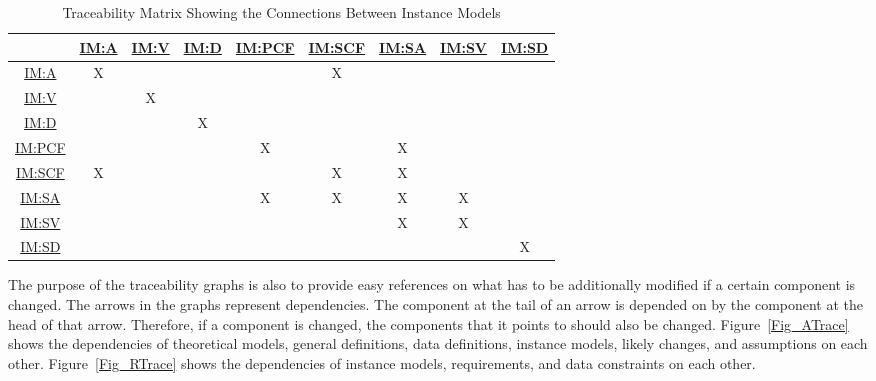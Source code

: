 \documentclass[12pt]{article}
\newcommand{\hpref}[1]{\hyperref[#1]{#1}}
\begin{document}
\begin{table}[h!]
\centering
\begin{tabular}{|c|c|c|c|c|c|c|c|c|}
\hline
	& \hpref{IM:A} & \hpref{IM:V}& \hpref{IM:D} & \hpref{IM:PCF} & \hpref{IM:SCF} & \hpref{IM:SA}& \hpref{IM:SV}& \hpref{IM:SD}\\
\hline
\hpref{IM:A}       &X& & & &X& & &  \\ \hline
\hpref{IM:V}       & &X& & & & & &  \\ \hline
\hpref{IM:D}       & & &X& & & & &  \\ \hline
\hpref{IM:PCF}       & & & &X& &X& &  \\ \hline
\hpref{IM:SCF}       &X& & & &X&X& &  \\ \hline
\hpref{IM:SA}       & & & &X&X&X&X&  \\ \hline
\hpref{IM:SV}       & & & & & &X&X&  \\ \hline
\hpref{IM:SD}       & & & & & & & &X \\ \hline
\end{tabular}
\caption{Traceability Matrix Showing the Connections Between Instance Models}
\label{Table:trace_IM}
\end{table}


The purpose of the traceability graphs is also to provide easy references on
what has to be additionally modified if a certain component is changed.  The
arrows in the graphs represent dependencies. The component at the tail of an
arrow is depended on by the component at the head of that arrow. Therefore, if a
component is changed, the components that it points to should also be
changed. Figure~\ref{Fig_ATrace} shows the dependencies of theoretical models,
general definitions, data definitions, instance models, likely changes, and
assumptions on each other. Figure~\ref{Fig_RTrace} shows the dependencies of
instance models, requirements, and data constraints on each other.



\end{document}
